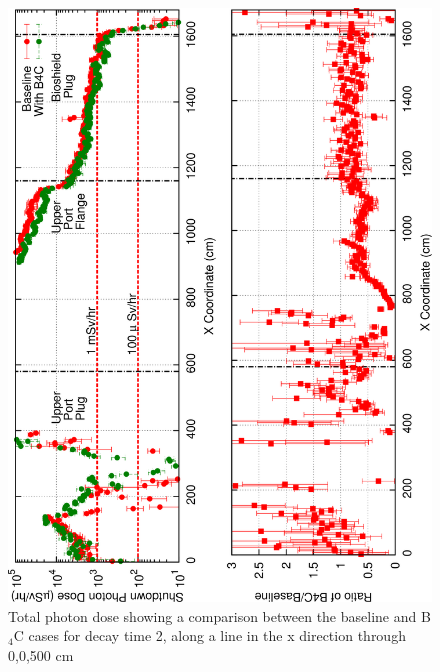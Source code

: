 \documentclass[12pt]{article}
\begin{document}
\begin{figure}[ht!]
\centering
\includegraphics[angle=-90,clip,scale=0.15]{../plots/photon_lineout/dc2_z500_lineout.png}
\caption{Total photon dose showing a comparison between the baseline and B$_4$C cases for decay time 2,
                 along a line in the x direction through 0,0,500 cm}
\label{fig:photons_dc2_total_dose_lineout_z500}
\end{figure}
\end{document}
